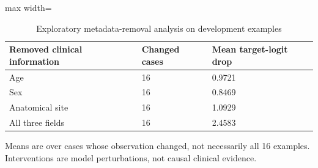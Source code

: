 \begin{table}[t]
\centering
\small
\caption{Exploratory metadata-removal analysis on development examples}
\label{tab:11-xai-metadata}
\begin{adjustbox}{max width=\textwidth}
\begin{tabular}{lll}
\toprule
\textbf{Removed clinical information} & \textbf{Changed cases} & \textbf{Mean target-logit drop} \\
\midrule
Age & 16 & 0.9721 \\
Sex & 16 & 0.8469 \\
Anatomical site & 16 & 1.0929 \\
All three fields & 16 & 2.4583 \\
\bottomrule
\end{tabular}
\end{adjustbox}
\par\smallskip
\begin{minipage}{\textwidth}\footnotesize Means are over cases whose observation changed, not necessarily all 16 examples. Interventions are model perturbations, not causal clinical evidence.\end{minipage}
\end{table}
